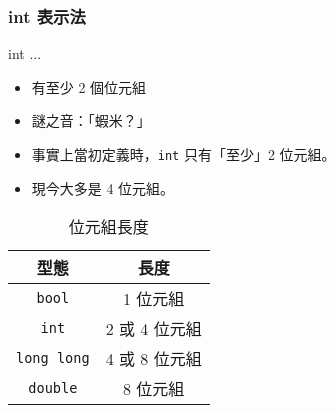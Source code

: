 \documentclass[utf8]{beamer}
\begin{document}
\begin{CJK}{UTF8}{bkai}
\begin{frame}[fragile]
  \frametitle{int 表示法}
  \begin{block}{int ...}
    \begin{itemize}
    \item 有至少 2 個位元組
    \item<2-> 謎之音：「蝦米？」
    \item<4-> 事實上當初定義時，\lstinline{int}{} 只有「至少」2 位元組。
    \item<5-> 現今大多是 4 位元組。
    \end{itemize}
  \end{block}
  \pause \pause \pause \pause \pause
  \begin{table}[h]
    \begin{tabular}{|c|c|}
      \hline
      型態                     & 長度\\
      \hline
      \lstinline{bool}{}      & 1 位元組\\
      \hline
      \lstinline{int}{}       & 2 或 \alert{4} 位元組\\
      \hline
      \lstinline{long long}{} & 4 或 \alert{8} 位元組\\
      \hline
      \lstinline{double}{}    & 8 位元組\\
      \hline
    \end{tabular}
    \caption{位元組長度}
  \end{table}
\end{frame}


\end{CJK}
\end{document}
